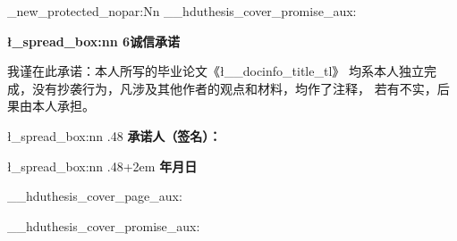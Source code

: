 \cs_new_protected_nopar:Nn \__hduthesis_cover_promise_aux:
  {
    \vspace*{3.5\baselineskip}
    \begin{center}
      \@beginparpenalty\@lowpenalty
      \Large\textsf{\bfseries \l_spread_box:nn {6\ccwd}{诚信承诺}}
      \@endparpenalty\@M
    \end{center}
    \vspace*{.6\baselineskip}\par
    \linespread{2.1}
      {\semilarge
        我谨在此承诺：本人所写的毕业论文《\l__docinfo_title_tl》
        均系本人独立完成，没有抄袭行为，凡涉及其他作者的观点和材料，均作了注释，
        若有不实，后果由本人承担。\par\vspace*{\baselineskip}
        \l_spread_box:nn {.48\linewidth}{}
          \textsf{\bfseries 承诺人（签名）：}
        \vspace*{.5\baselineskip}\par
        \l_spread_box:nn {.48\linewidth+2em}{}
          \textsf{\bfseries 年\qquad 月\qquad 日}
      }
  }

\RenewDocumentCommand \maketitle {}
  {
    \begin{titlepage}
      \__hduthesis_cover_page_aux:
    \end{titlepage}
    \titlepage
      \__hduthesis_cover_promise_aux:
    \endtitlepage
  }

\endinput